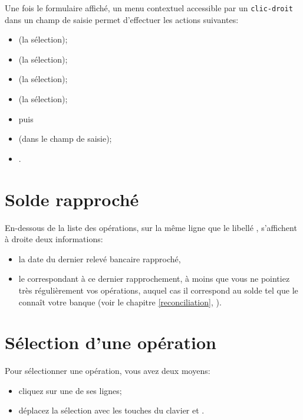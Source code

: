 Une fois le formulaire affiché, un menu contextuel accessible par un \texttt{clic-droit} dans un champ de saisie permet d'effectuer les actions suivantes:

\begin{itemize}
	\item {} (la sélection);
	\item {} (la sélection);
	\item {} (la sélection);
	\item {} (la sélection);
	\item[]\hspace{-12pt} puis
	\item {} (dans le champ de saisie);
	\item {}.
\end{itemize}


\section{Solde rapproché\label{transactions-balance}}

En-dessous de la liste des opérations, sur la même ligne que le libellé , s'affichent à droite deux informations:
\begin{itemize}
	\item la date du dernier relevé bancaire rapproché,
	\item le  correspondant à ce dernier rapprochement, à moins que vous ne pointiez très régulièrement vos opérations, auquel cas il correspond au solde tel que le connaît votre banque (voir le chapitre \vref{reconciliation}, ).
\end{itemize}


\section{Sélection d'une opération\label{transactions-selection}}

Pour sélectionner une opération, vous avez deux moyens:

\begin{itemize}
	 \item cliquez sur une de ses lignes;
	 \item déplacez la sélection avec les touches du clavier \keys{\arrowkeyup} et \keys{\arrowkeydown}.
\end{itemize}

